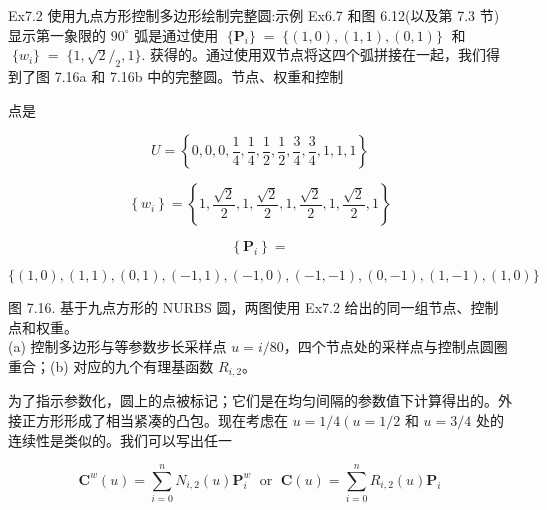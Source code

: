 \documentclass[../main.tex]{subfiles}
\begin{document}
Ex7.2 使用九点方形控制多边形绘制完整圆:示例 Ex6.7 和图 6.12(以及第 7.3 节)显示第一象限的 \({90}^{ \circ  }\) 弧是通过使用 \(\;\{ {\mathbf{P}}_{i}\} \; = \;\{ \left( {1,0}\right) ,\left( {1,1}\right) ,\left( {0,1}\right) \} \;\) 和 \(\;\{ {w}_{i}\} \; = \;\{ 1,\sqrt{2}{/}_{2},1\} .\) 获得的。通过使用双节点将这四个弧拼接在一起，我们得到了图 7.16a 和 7.16b 中的完整圆。节点、权重和控制

点是

\[
U = \left\{  {0,0,0,\frac{1}{4},\frac{1}{4},\frac{1}{2},\frac{1}{2},\frac{3}{4},\frac{3}{4},1,1,1}\right\}
\]

\[
\left\{  {w}_{i}\right\}   = \left\{  {1,\frac{\sqrt{2}}{2},1,\frac{\sqrt{2}}{2},1,\frac{\sqrt{2}}{2},1,\frac{\sqrt{2}}{2},1}\right\}
\]

\[
\left\{  {\mathbf{P}}_{i}\right\}   =
\]

\[
\{ \left( {1,0}\right) ,\left( {1,1}\right) ,\left( {0,1}\right) ,\left( {-1,1}\right) ,\left( {-1,0}\right) ,\left( {-1, - 1}\right) ,\left( {0, - 1}\right) ,\left( {1, - 1}\right) ,\left( {1,0}\right) \}
\]





\begin{center}
\begin{minipage}{30cm}
\vspace*{.6\baselineskip}
\centering
\begin{minipage}{14cm}\centering
{}
\end{minipage}\hfill
\begin{minipage}{14cm}\centering
{}
\end{minipage}
\par\smallskip
图 7.16. 基于九点方形的 NURBS 圆，两图使用 Ex7.2 给出的同一组节点、控制点和权重。\\
(a) 控制多边形与等参数步长采样点 $u=i/80$，四个节点处的采样点与控制点圆圈重合；(b) 对应的九个有理基函数 $R_{i,2}$。
\end{minipage}
\end{center}

为了指示参数化，圆上的点被标记；它们是在均匀间隔的参数值下计算得出的。外接正方形形成了相当紧凑的凸包。现在考虑在 \(u = 1/4\left( {u = 1/2}\right.\) 和 \(u = 3/4\) 处的连续性是类似的。我们可以写出任一

\[
{\mathbf{C}}^{w}\left( u\right)  = \mathop{\sum }\limits_{{i = 0}}^{n}{N}_{i,2}\left( u\right) {\mathbf{P}}_{i}^{w}\;\text{ or }\;\mathbf{C}\left( u\right)  = \mathop{\sum }\limits_{{i = 0}}^{n}{R}_{i,2}\left( u\right) {\mathbf{P}}_{i}
\]
\end{document}
